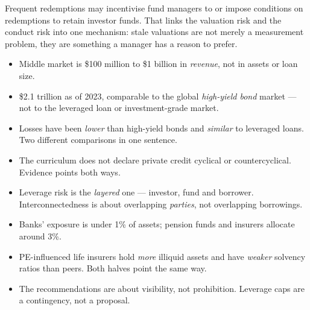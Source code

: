 \begin{imtrapbox}[breakable=false,title={The conflict that matters most}]
Frequent redemptions may incentivise fund managers to 
or impose conditions on redemptions to retain investor funds. That links the
valuation risk and the conduct risk into one mechanism: stale valuations are not
merely a measurement problem, they are something a manager has a reason to
prefer.
\end{imtrapbox}

\begin{imtrapbox}[breakable=false,title={Consolidated trap summary --- IM-10}]
\begin{itemize}
\item {} Middle market is \$100 million to \$1 billion in
\emph{revenue}, not in assets or loan size.
\item {} \$2.1 trillion as of 2023, comparable to the global
\emph{high-yield bond} market --- not to the leveraged loan or investment-grade
market.
\item {} Losses have been \emph{lower} than high-yield
bonds and \emph{similar} to leveraged loans. Two different comparisons in one
sentence.
\item {} The curriculum does not declare private credit
cyclical or countercyclical. Evidence points both ways.
\item {} Leverage risk is the \emph{layered} one --- investor,
fund and borrower. Interconnectedness is about overlapping \emph{parties}, not
overlapping borrowings.
\item {} Banks' exposure is under 1\% of assets; pension funds
and insurers allocate around 3\%.
\item {} PE-influenced life insurers hold \emph{more} illiquid
assets and have \emph{weaker} solvency ratios than peers. Both halves point the
same way.
\item {} The recommendations are about visibility, not
prohibition. Leverage caps are a contingency, not a proposal.
\end{itemize}
\end{imtrapbox}

